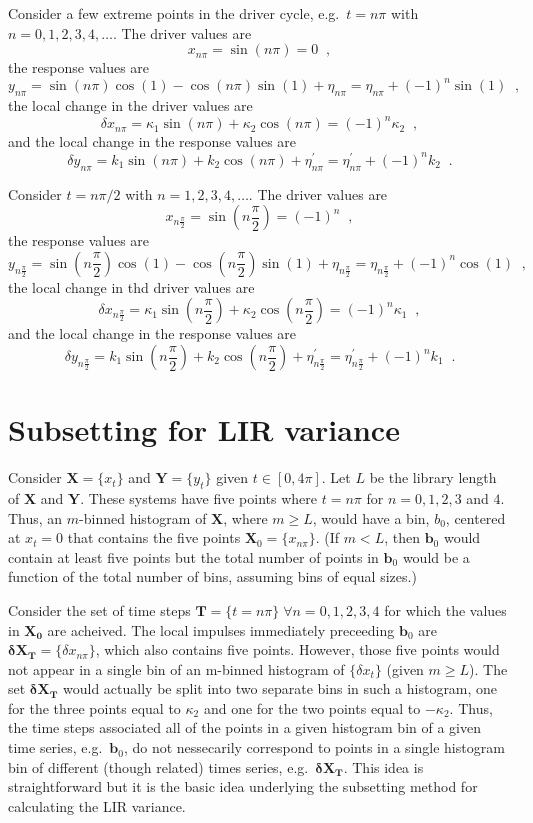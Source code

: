 \documentclass[a4paper,11pt]{article}
\begin{document}
Consider a few extreme points in the driver cycle, e.g.\ $t=n\pi$ with $n=0,1,2,3,4,\ldots$.  The driver values are
$$
x_{n\pi} = \sin(n\pi) = 0\;\;,
$$
the response values are
$$
y_{n\pi} = \sin(n\pi)\cos(1)-\cos(n\pi)\sin(1)+ \eta_{n\pi} = \eta_{n\pi} + \left(-1\right)^n\sin(1)\;\;,
$$
the local change in the driver values are
$$
\delta x_{n\pi} = \kappa_1\sin(n\pi)+\kappa_2\cos(n\pi) = \left(-1\right)^n \kappa_2\;\;,
$$
and the local change in the response values are
$$
\delta y_{n\pi} = k_1\sin(n\pi)+k_2\cos(n\pi)+\eta^\prime_{n\pi} = \eta^\prime_{n\pi} + \left(-1\right)^n k_2\;\;.
$$

Consider $t=n\pi/2$ with $n=1,2,3,4,\ldots$.  The driver values are
$$
x_{n\frac{\pi}{2}} = \sin\left(n\frac{\pi}{2}\right) = (-1)^n\;\;,
$$
the response values are
$$
y_{n\frac{\pi}{2}} = \sin\left(n\frac{\pi}{2}\right)\cos(1)-\cos\left(n\frac{\pi}{2}\right)\sin(1)+ \eta_{n\frac{\pi}{2}} = \eta_{n\frac{\pi}{2}} + (-1)^n\cos(1)\;\;,
$$
the local change in thd driver values are
$$
\delta x_{n\frac{\pi}{2}} = \kappa_1\sin\left(n\frac{\pi}{2}\right)+\kappa_2\cos\left(n\frac{\pi}{2}\right) = \left(-1\right)^n \kappa_1\;\;,
$$
and the local change in the response values are
$$
\delta y_{n\frac{\pi}{2}} = k_1\sin\left(n\frac{\pi}{2}\right)+k_2\cos\left(n\frac{\pi}{2}\right)+\eta^\prime_{n\frac{\pi}{2}} = \eta^\prime_{n\frac{\pi}{2}} + \left(-1\right)^n k_1\;\;.
$$

\section{Subsetting for LIR variance}
Consider $\mathbf{X}=\{x_t\}$ and $\mathbf{Y}=\{y_t\}$ given $t\in[0,4\pi]$.  Let $L$ be the library length of $\mathbf{X}$ and $\mathbf{Y}$.  These systems have five points where $t=n\pi$ for $n=0,1,2,3$ and $4$. Thus, an $m$-binned histogram of $\mathbf{X}$, where $m\ge L$, would have a bin, $b_0$, centered at $x_t=0$ that contains the five points $\mathbf{X}_{0} = \{x_{n\pi}\}$.  (If $m<L$, then $\mathbf{b}_0$ would contain at least five points but the total number of points in $\mathbf{b}_0$ would be a function of the total number of bins, assuming bins of equal sizes.)  

Consider the set of time steps $\mathbf{T}=\{t=n\pi\}\;\forall n=0,1,2,3,4$ for which the values in $\mathbf{X_0}$ are acheived.  The local impulses immediately preceeding $\mathbf{b}_0$ are $\mathbf{\delta X}_\mathbf{T}=\{\delta x_{n\pi}\}$, which also contains five points.  However, those five points would not appear in a single bin of an m-binned histogram of $\{\delta x_t\}$ (given $m\ge L$).  The set $\mathbf{\delta X}_\mathbf{T}$ would actually be split into two separate bins in such a histogram, one for the three points equal to $\kappa_2$ and one for the two points equal to $-\kappa_2$.  Thus, the time steps associated all of the points in a given histogram bin of a given time series, e.g.\ $\mathbf{b}_0$, do not nessecarily correspond to points in a single histogram bin of different (though related) times series, e.g.\ $\mathbf{\delta X}_\mathbf{T}$.  This idea is straightforward but it is the basic idea underlying the subsetting method for calculating the LIR variance.
\end{document}
